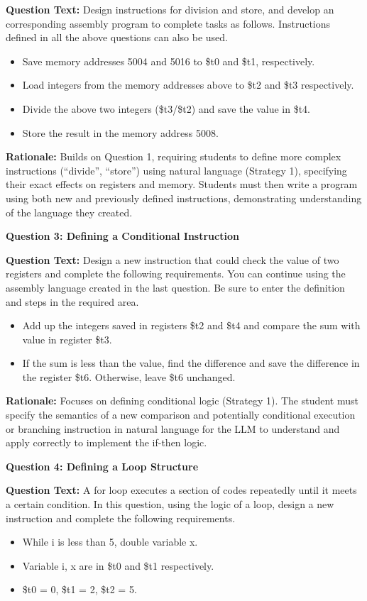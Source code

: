 \documentclass{article} %
\begin{document}
\textbf{Question Text:} Design instructions for division and store, and develop an corresponding assembly program to complete tasks as follows. Instructions defined in all the above questions can also be used.
\begin{itemize}
    \item Save memory addresses 5004 and 5016 to \$t0 and \$t1, respectively.
    \item Load integers from the memory addresses above to \$t2 and \$t3 respectively.
    \item Divide the above two integers (\$t3/\$t2) and save the value in \$t4.
    \item Store the result in the memory address 5008.
\end{itemize}

\textbf{Rationale:} Builds on Question 1, requiring students to define more complex instructions (``divide'', ``store'') using natural language (Strategy 1), specifying their exact effects on registers and memory. Students must then write a program using both new and previously defined instructions, demonstrating understanding of the language they created.

\textbf{Question 3: Defining a Conditional Instruction}

\textbf{Question Text:} Design a new instruction that could check the value of two registers and complete the following requirements. You can continue using the assembly language created in the last question. Be sure to enter the definition and steps in the required area.
\begin{itemize}
    \item Add up the integers saved in registers \$t2 and \$t4 and compare the sum with value in register \$t3.
    \item If the sum is less than the value, find the difference and save the difference in the register \$t6. Otherwise, leave \$t6 unchanged.
\end{itemize}

\textbf{Rationale:} Focuses on defining conditional logic (Strategy 1). The student must specify the semantics of a new comparison and potentially conditional execution or branching instruction in natural language for the LLM to understand and apply correctly to implement the if-then logic.

\textbf{Question 4: Defining a Loop Structure}

\textbf{Question Text:} A for loop executes a section of codes repeatedly until it meets a certain condition. In this question, using the logic of a loop, design a new instruction and complete the following requirements.
\begin{itemize}
    \item While i is less than 5, double variable x.
    \item Variable i, x are in \$t0 and \$t1 respectively.
    \item \$t0 = 0, \$t1 = 2, \$t2 = 5.
\end{itemize}
\end{document}
